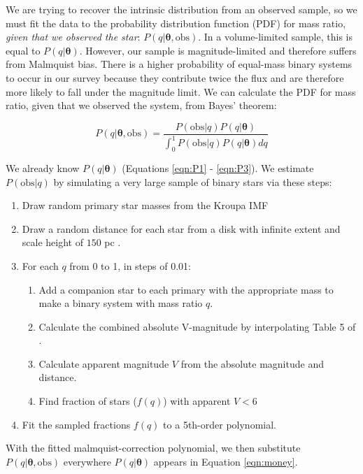 \documentclass{emulateapj}
\renewcommand{\vec}[1]{\bm{#1}}
\begin{document}
We are trying to recover the intrinsic distribution from an observed sample, so we must fit the data to the probability distribution function (PDF) for mass ratio, \emph{given that we observed the star}: $P(q|\vec{\theta}, \mathrm{obs})$. In a volume-limited sample, this is equal to $P(q|\vec{\theta})$. However, our sample is magnitude-limited and therefore suffers from Malmquist bias. There is a higher probability of equal-mass binary systems to occur in our survey because they contribute twice the flux and are therefore more likely to fall under the magnitude limit. We can calculate the PDF for mass ratio, given that we observed the system, from Bayes' theorem:

\begin{equation}
P(q|\vec{\theta}, \mathrm{obs}) = \frac{P(\mathrm{obs}|q) P(q|\vec{\theta})}{\int_0^1 P(\mathrm{obs}|q) P(q|\vec{\theta}) dq}
\end{equation}

We already know $P(q|\vec{\theta})$ (Equations \ref{eqn:P1} - \ref{eqn:P3}). We estimate $P(\mathrm{obs}|q)$ by simulating a very large sample of binary stars via these steps:

\begin{enumerate}
\item Draw random primary star masses from the Kroupa IMF \citep{Kroupa2002}
\item Draw a random distance for each star from a disk with infinite extent and scale height of $150$ pc \citep[the approximate scale height of the Milky Way disk for A-type stars,][]{BM1998}. 
\item For each $q$ from 0 to 1, in steps of 0.01:
\begin{enumerate}
  \item Add a companion star to each primary with the appropriate mass to make a binary system with mass ratio $q$.
  \item Calculate the combined absolute V-magnitude by interpolating Table 5 of \citet{Pecaut2013}.
  \item Calculate apparent magnitude $V$ from the absolute magnitude and distance.
  \item Find fraction of stars ($f(q)$) with apparent $V < 6$
\end{enumerate}
\item Fit the sampled fractions $f(q)$ to a 5th-order polynomial.
\end{enumerate}

With the fitted malmquist-correction polynomial, we then substitute $P(q|\vec{\theta}, \mathrm{obs})$ everywhere $P(q|\vec{\theta})$ appears in Equation \ref{eqn:money}.
\end{document}
